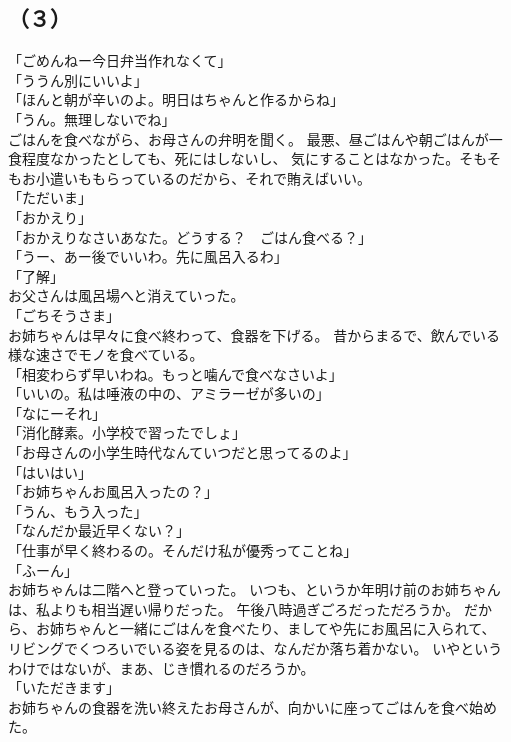 \documentclass[../IHMain]{subfiles}
\begin{document}
\subsection*{（３）}
「ごめんねー今日弁当作れなくて」\\
「ううん別にいいよ」\\
「ほんと朝が辛いのよ。明日はちゃんと作るからね」\\
「うん。無理しないでね」\\
ごはんを食べながら、お母さんの弁明を聞く。
最悪、昼ごはんや朝ごはんが一食程度なかったとしても、死にはしないし、
気にすることはなかった。そもそもお小遣いももらっているのだから、それで賄えばいい。\\
「ただいま」\\
「おかえり」\\
「おかえりなさいあなた。どうする？　ごはん食べる？」\\
「うー、あー後でいいわ。先に風呂入るわ」\\
「了解」\\
お父さんは風呂場へと消えていった。\\
「ごちそうさま」\\
お姉ちゃんは早々に食べ終わって、食器を下げる。
昔からまるで、飲んでいる様な速さでモノを食べている。\\
「相変わらず早いわね。もっと噛んで食べなさいよ」\\
「いいの。私は唾液の中の、アミラーゼが多いの」\\
「なにーそれ」\\
「消化酵素。小学校で習ったでしょ」\\
「お母さんの小学生時代なんていつだと思ってるのよ」\\
「はいはい」\\
「お姉ちゃんお風呂入ったの？」\\
「うん、もう入った」\\
「なんだか最近早くない？」\\
「仕事が早く終わるの。そんだけ私が優秀ってことね」\\
「ふーん」\\
お姉ちゃんは二階へと登っていった。
いつも、というか年明け前のお姉ちゃんは、私よりも相当遅い帰りだった。
午後八時過ぎごろだっただろうか。
だから、お姉ちゃんと一緒にごはんを食べたり、ましてや先にお風呂に入られて、
リビングでくつろいでいる姿を見るのは、なんだか落ち着かない。
いやというわけではないが、まあ、じき慣れるのだろうか。\\
「いただきます」\\
お姉ちゃんの食器を洗い終えたお母さんが、向かいに座ってごはんを食べ始めた。\\
\end{document}
